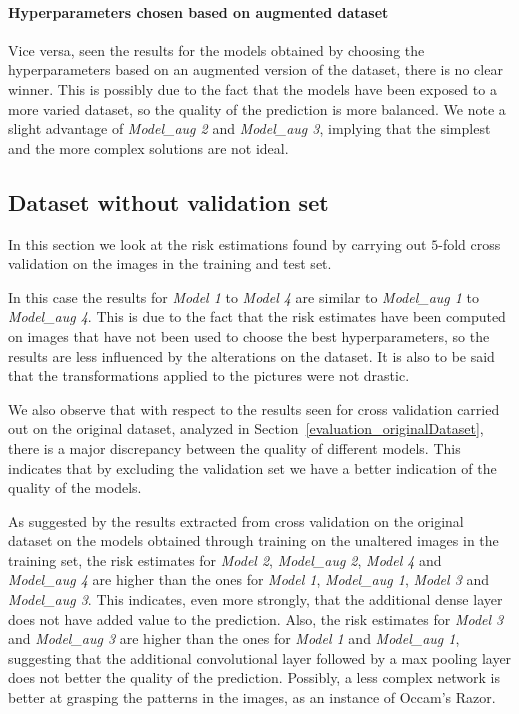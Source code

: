 \paragraph{Hyperparameters chosen based on augmented dataset}
Vice versa, seen the results for the models obtained by choosing the hyperparameters based on an augmented version of the dataset, there is no clear winner. This is possibly due to the fact that the models have been exposed to a more varied dataset, so the quality of the prediction is more balanced. We note a slight advantage of \textsl{Model\_aug 2} and \textsl{Model\_aug 3}, implying that the simplest and the more complex solutions are not ideal.

\subsection{Dataset without validation set}\label{evaluation_datasetWithoutVal}
In this section we look at the risk estimations found by carrying out $5$-fold cross validation on the images in the training and test set.

In this case the results for \textit{Model 1} to \textit{Model 4} are similar to \textit{Model\_aug 1} to \textit{Model\_aug 4}. This is due to the fact that the risk estimates have been computed on images that have not been used to choose the best hyperparameters, so the results are less influenced by the alterations on the dataset. It is also to be said that the transformations applied to the pictures were not drastic.

We also observe that with respect to the results seen for cross validation carried out on the original dataset, analyzed in Section~\ref{evaluation_originalDataset}, there is a major discrepancy between the quality of different models. This indicates that by excluding the validation set we have a better indication of the quality of the models.

As suggested by the results extracted from cross validation on the original dataset on the models obtained through training on the unaltered images in the training set, the risk estimates for \textsl{Model 2}, \textsl{Model\_aug 2}, \textsl{Model 4} and \textsl{Model\_aug 4} are higher than the ones for \textsl{Model 1}, \textsl{Model\_aug 1}, \textsl{Model 3} and \textsl{Model\_aug 3}. This indicates, even more strongly, that the additional dense layer does not have added value to the prediction. Also, the risk estimates for \textsl{Model 3} and \textsl{Model\_aug 3} are higher than the ones for \textsl{Model 1} and \textsl{Model\_aug 1}, suggesting that the additional convolutional layer followed by a max pooling layer does not better the quality of the prediction. Possibly, a less complex network is better at grasping the patterns in the images, as an instance of Occam's Razor.
